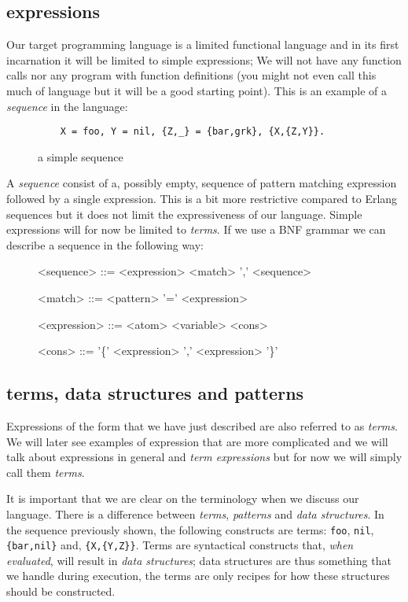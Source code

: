 \documentclass[a4paper,11pt]{article}
\begin{document}
\subsection{expressions}

Our target programming language is a limited functional language and
in its first incarnation it will be limited to simple expressions; We
will not have any function calls nor any program with function
definitions (you might not even call this much of language but it will
be a good starting point). This is an example of a {\em sequence} in
the language:

\begin{figure}[h]
\begin{verbatim}
    X = foo, Y = nil, {Z,_} = {bar,grk}, {X,{Z,Y}}.
\end{verbatim} 
\caption{a simple sequence}
\label{fig:sequence}
\end{figure}
 
A {\em sequence} consist of a, possibly empty, sequence of pattern
matching expression followed by a single expression. This is a bit
more restrictive compared to Erlang sequences but it does not limit
the expressiveness of our language. Simple expressions will for now be
limited to {\em terms}. If we use a BNF grammar we can describe a
sequence in the following way:

\begin{figure}[h]
\begin{grammar}
<sequence> ::= <expression> \alt <match> ',' <sequence>

<match> ::= <pattern> '=' <expression> 

<expression> ::= <atom> \alt <variable> \alt <cons> 

<cons> ::= '\{' <expression> ',' <expression> '\}'
\end{grammar}
\end{figure}

\subsection{terms, data structures and patterns}

Expressions of the form that we have just described are also referred
to as {\em terms}. We will later see examples of expression that are
more complicated and we will talk about expressions in general and
{\em term expressions} but for now we will simply call them {\em terms}.

It is important that we are clear on the terminology when we discuss
our language. There is a difference between {\em terms}, {\em
  patterns} and {\em data structures}. In the sequence previously
shown, the following constructs are terms: \verb+foo+, \verb+nil+,
\verb+{bar,nil}+ and, \verb+{X,{Y,Z}}+. Terms are syntactical
constructs that, {\em when evaluated}, will result in {\em data
  structures}; data structures are thus something that we handle
during execution, the terms are only recipes for how these structures
should be constructed.
\end{document}
